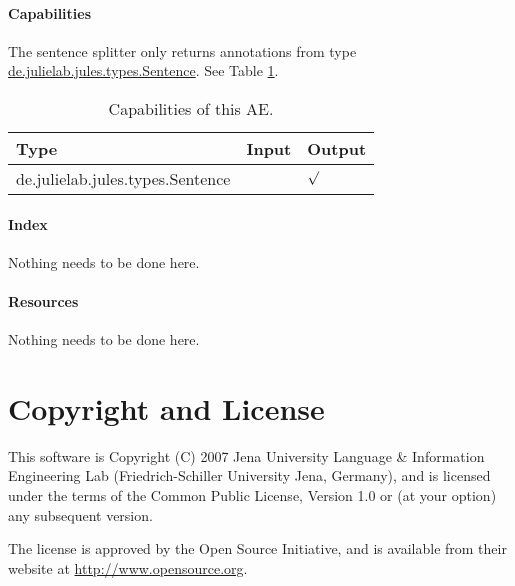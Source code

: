 \documentclass[11pt,a4paper,halfparskip]{scrartcl}
\begin{document}
\paragraph{Capabilities}
\label{sss:capabilities}
The sentence splitter only returns annotations from type \url{de.julielab.jules.types.Sentence}. See Table \ref{tab:capabilities}.
\begin{table}[h!]
  \centering
  \begin{tabular}{|p{5cm}|p{2cm}|p{2cm}|}
    \hline
    Type & Input & Output \\
    \hline\hline
     de.julielab.jules.types.Sentence & &  $\surd$  \\
      \hline
  \end{tabular}
  \caption{Capabilities of this AE.}
  \label{tab:capabilities}
\end{table} 

\paragraph{Index}
Nothing needs to be done here.

\paragraph{Resources}
Nothing needs to be done here.


\section{Copyright and License}
This software is Copyright (C) 2007 Jena University Language \& Information
Engineering Lab (Friedrich-Schiller University Jena, Germany), and is
licensed under the terms of the Common Public License, Version 1.0 or (at
your option) any subsequent version.

The license is approved by the Open Source Initiative, and is
available from their website at \url{http://www.opensource.org}.



\end{document}
